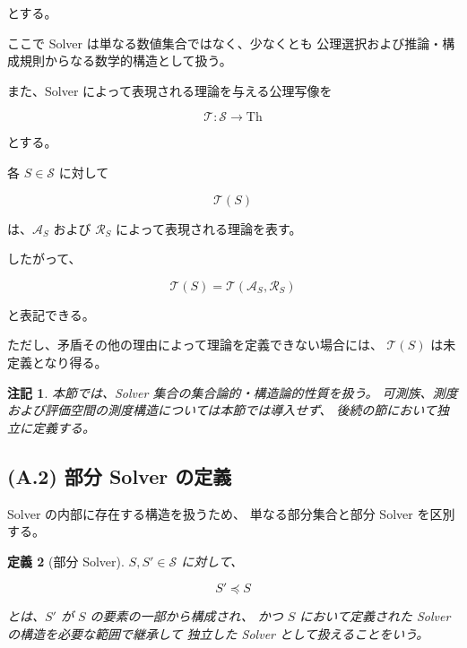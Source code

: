 \documentclass[a4paper,11pt]{article}
\newtheorem{definition}{定義}[section]
\newtheorem{remark}[definition]{注記}
\newcommand{\Solver}{\mathcal{S}}
\newcommand{\SubSolver}{\preceq}
\newcommand{\Aset}{\mathcal{A}}
\newcommand{\Rset}{\mathcal{R}}
\newcommand{\Th}{\mathrm{Th}}
\begin{document}
とする。

ここで Solver は単なる数値集合ではなく、少なくとも
公理選択および推論・構成規則からなる数学的構造として扱う。

また、Solver によって表現される理論を与える公理写像を

\begin{equation}
    \mathcal{T}:
    \Solver
    \longrightarrow
    \Th
    \label{eq:A-theory-map}
\end{equation}

とする。

各 $S\in\Solver$ に対して

\begin{equation}
    \mathcal{T}(S)
\end{equation}

は、$\Aset_S$ および $\Rset_S$ によって表現される理論を表す。

したがって、

\begin{equation}
    \mathcal{T}(S)
    =
    \mathcal{T}
    \left(
        \Aset_S,\Rset_S
    \right)
    \label{eq:A-theory-decomposition}
\end{equation}

と表記できる。

ただし、矛盾その他の理由によって理論を定義できない場合には、
$\mathcal{T}(S)$ は未定義となり得る。

\begin{remark}
本節では、Solver 集合の集合論的・構造論的性質を扱う。
可測族、測度および評価空間の測度構造については本節では導入せず、
後続の節において独立に定義する。
\end{remark}


\subsection{(A.2) 部分 Solver の定義}
\label{subsec:A2}

Solver の内部に存在する構造を扱うため、
単なる部分集合と部分 Solver を区別する。

\begin{definition}[部分 Solver]
$S,S'\in\Solver$ に対して、

\begin{equation}
    S'\SubSolver S
\end{equation}

とは、$S'$ が $S$ の要素の一部から構成され、
かつ $S$ において定義された Solver の構造を必要な範囲で継承して
独立した Solver として扱えることをいう。
\end{definition}
\end{document}
